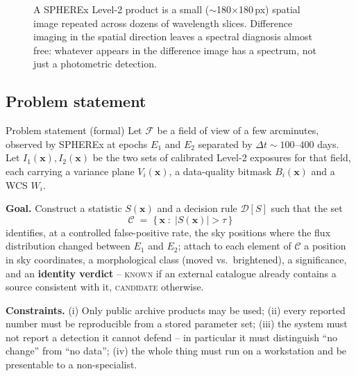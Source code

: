 \documentclass[11pt,a4paper]{article}
\begin{document}
\begin{figure}[H]
{}
\caption{A SPHEREx Level-2 product is a small ($\sim$180$\times$180\,px) spatial image repeated
across dozens of wavelength slices. Difference imaging in the spatial direction leaves a spectral
diagnosis almost free: whatever appears in the difference image has a spectrum, not just a
photometric detection.}
\label{fig:cube}
\end{figure}

\subsection{Problem statement}
\label{sec:problem}

\begin{keybox}{Problem statement (formal)}
Let $\mathcal{F}$ be a field of view of a few arcminutes, observed by SPHEREx at epochs
$E_1$ and $E_2$ separated by $\Delta t \sim 100$--$400$ days. Let
$I_1(\mathbf{x}), I_2(\mathbf{x})$ be the two sets of calibrated Level-2 exposures for that field,
each carrying a variance plane $V_i(\mathbf{x})$, a data-quality bitmask $B_i(\mathbf{x})$ and a
WCS $W_i$.

\smallskip
\textbf{Goal.} Construct a statistic $S(\mathbf{x})$ and a decision rule
$\mathcal{D}[S]$ such that the set
\[
   \mathcal{C} \;=\; \bigl\{\, \mathbf{x} \;:\; |S(\mathbf{x})| > \tau \,\bigr\}
\]
identifies, at a controlled false-positive rate, the sky positions where the flux distribution
changed between $E_1$ and $E_2$; attach to each element of $\mathcal{C}$ a position in sky
coordinates, a morphological class (moved vs.\ brightened), a significance, and an
\textbf{identity verdict} -- \textsc{known} if an external catalogue already contains a source
consistent with it, \textsc{candidate} otherwise.

\smallskip
\textbf{Constraints.} (i) Only public archive products may be used; (ii) every reported number must
be reproducible from a stored parameter set; (iii) the system must not report a detection it cannot
defend -- in particular it must distinguish ``no change'' from ``no data''; (iv) the whole thing must
run on a workstation and be presentable to a non-specialist.
\end{keybox}
\end{document}
